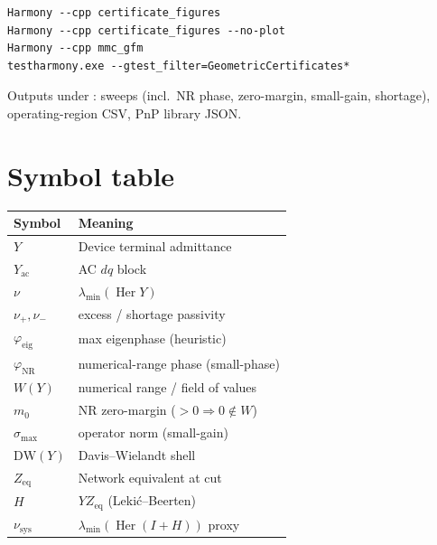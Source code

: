 \documentclass[11pt,a4paper]{article}
\theoremstyle{definition}
\newcommand{\Her}{\operatorname{Her}}
\newcommand{\code}[1]{\texttt{\detokenize{#1}}}
\begin{document}
\begin{lstlisting}
Harmony --cpp certificate_figures
Harmony --cpp certificate_figures --no-plot
Harmony --cpp mmc_gfm
testharmony.exe --gtest_filter=GeometricCertificates*
\end{lstlisting}

Outputs under \code{files/}: sweeps (incl.\ NR phase, zero-margin, small-gain,
shortage), operating-region CSV, PnP library JSON.

\section{Symbol table}

\begin{center}
\renewcommand{\arraystretch}{1.1}
\begin{tabularx}{\textwidth}{@{}L{2.4cm} Y@{}}
\toprule
Symbol & Meaning \\
\midrule
$Y$ & Device terminal admittance \\
$Y_{\mathrm{ac}}$ & AC $dq$ block \\
$\nu$ & $\lambda_{\min}(\Her Y)$ \\
$\nu_+,\nu_-$ & excess / shortage passivity \\
$\varphi_{\mathrm{eig}}$ & max eigenphase (heuristic) \\
$\varphi_{\mathrm{NR}}$ & numerical-range phase (small-phase) \\
$W(Y)$ & numerical range / field of values \\
$m_0$ & NR zero-margin ($>0\Rightarrow 0\notin W$) \\
$\sigma_{\max}$ & operator norm (small-gain) \\
$\mathrm{DW}(Y)$ & Davis--Wielandt shell \\
$Z_{\mathrm{eq}}$ & Network equivalent at cut \\
$H$ & $YZ_{\mathrm{eq}}$ (Leki\'c--Beerten) \\
$\nu_{\mathrm{sys}}$ & $\lambda_{\min}(\Her(I+H))$ proxy \\
\bottomrule
\end{tabularx}
\end{center}
\end{document}
